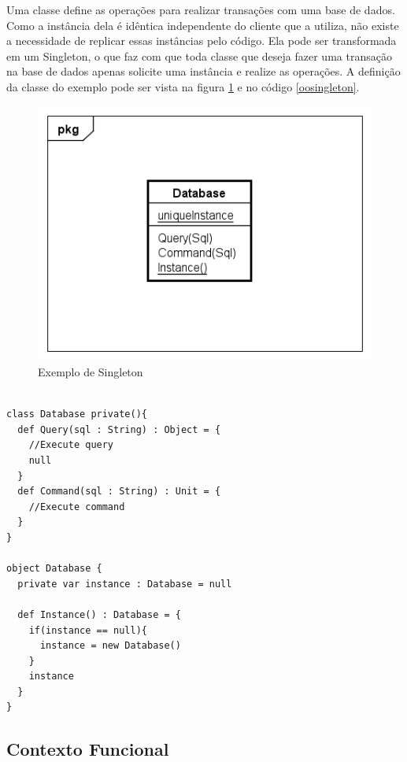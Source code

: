 Uma classe define as operações para realizar transações com 
uma base de dados. Como a instância dela é idêntica independente 
do cliente que a utiliza, não existe a necessidade de replicar 
essas instâncias pelo código. Ela pode ser transformada em 
um Singleton, o que faz com que toda classe que deseja fazer 
uma transação na base de dados apenas solicite uma instância 
e realize as operações. A definição da classe do exemplo 
pode ser vista na figura \ref{singleton_exemplo} e no 
código \ref{oosingleton}.

\begin{figure}[htb]
	\caption{\label{singleton_exemplo}Exemplo de Singleton}
	\begin{center}
	    \includegraphics[scale=0.6]{5_padroes-contexto-funcional/5.1_criacionais/5.1.5_singleton/singleton_exemplo.png}
	\end{center}
\end{figure}

\begin{lstlisting}[caption={Singleton Orientação a Objetos},label=oosingleton]

class Database private(){
  def Query(sql : String) : Object = {
    //Execute query
    null
  }
  def Command(sql : String) : Unit = {
    //Execute command
  }
}

object Database {
  private var instance : Database = null

  def Instance() : Database = {
    if(instance == null){
      instance = new Database()
    }
    instance
  }
}

\end{lstlisting}

\subsection*{Contexto Funcional}

